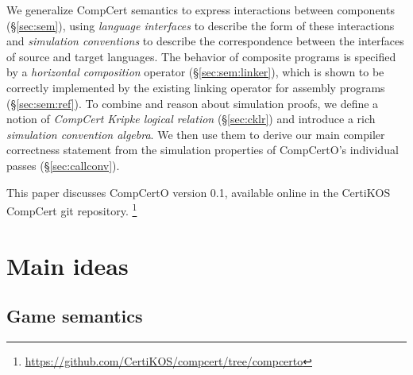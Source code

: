 \documentclass[sigplan,screen,review]{acmart}
\begin{document}
We generalize CompCert semantics
to express interactions between components (\S\ref{sec:sem}),
using \emph{language interfaces}
to describe the form of these interactions
and \emph{simulation conventions}
to describe the correspondence between the interfaces
of source and target languages.
The behavior of
composite programs is specified by a
\emph{horizontal composition} operator (\S\ref{sec:sem:linker}),
which is shown to be correctly implemented
by the existing linking operator for assembly programs
(\S\ref{sec:sem:ref}).
To combine and reason about simulation proofs,
we define a notion of
\emph{CompCert Kripke logical relation} (\S\ref{sec:cklr})
and introduce a rich \emph{simulation convention algebra}.
We then use them to derive our main compiler correctness statement
from the simulation properties
of CompCertO's individual passes
(\S\ref{sec:callconv}).



This paper discusses CompCertO version 0.1,
available online in the CertiKOS CompCert git repository.%
\footnote{\url{https://github.com/CertiKOS/compcert/tree/compcerto}}



\section{Main ideas} \label{sec:mainideas} %

\subsection{Game semantics} \label{sec:gamesem} %
\end{document}
